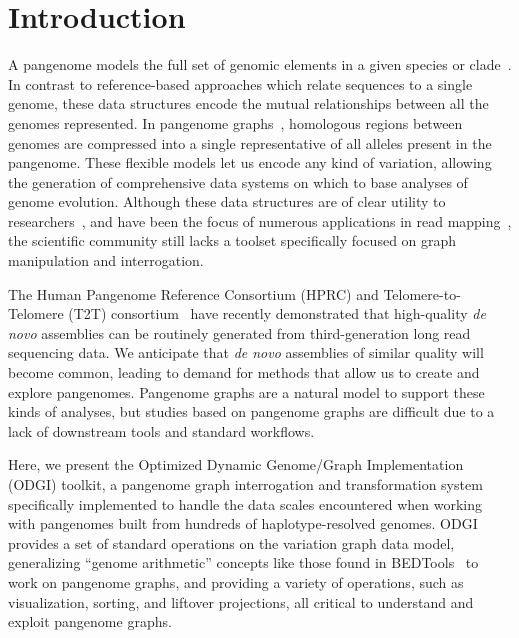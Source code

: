 \documentclass{bioinfo}
\begin{document}
\maketitle

\section{Introduction}
A pangenome models the full set of genomic elements in a given species or clade~\citep{cpang2018,Eizenga_2020}.
In contrast to reference-based approaches which relate sequences to a single genome, these data structures encode the mutual relationships between all the genomes represented.
In pangenome graphs~\citep{Paten:2017}, homologous regions between genomes are compressed into a single representative of all alleles present in the pangenome.
These flexible models let us encode any kind of variation, allowing the generation of comprehensive data systems on which to base analyses of genome evolution.
Although these data structures are of clear utility to researchers~\citep{cpang2018}, and have been the focus of numerous applications in read mapping~\citep{Garrison:2018,Baaijens_2019,Hickey:2020,Sibbesen_2021},
the scientific community still lacks a toolset specifically focused on graph manipulation and interrogation.

The Human Pangenome Reference Consortium (HPRC) and Telomere-to-Telomere (T2T) consortium~\citep{Miga:2020, Logsdon_2021, Nurk_2021} have recently demonstrated that high-quality \textit{de novo} assemblies can be routinely generated from third-generation long read sequencing data.
We anticipate that \textit{de novo} assemblies of similar quality will become common, leading to demand for methods that allow us to create and explore pangenomes.
Pangenome graphs are a natural model to support these kinds of analyses, but studies based on pangenome graphs are difficult due to a lack of downstream tools and standard workflows.

Here, we present the Optimized Dynamic Genome/Graph Implementation (ODGI) toolkit, a pangenome graph interrogation and transformation system specifically implemented to handle the data scales encountered when working with pangenomes built from hundreds of haplotype-resolved genomes.
ODGI provides a set of standard operations on the variation graph data model, generalizing ``genome arithmetic'' concepts like those found in BEDTools~\citep{Quinlan_2010} to work on pangenome graphs,
and providing a variety of operations, such as visualization, sorting, and liftover projections, all critical to understand and exploit pangenome graphs.
\end{document}
